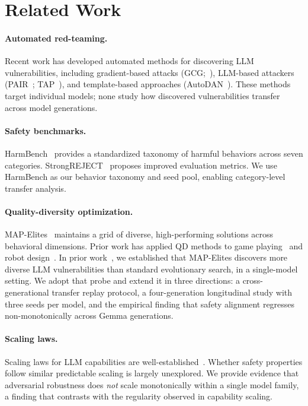 \documentclass{article}
\begin{document}
\section{Related Work}
\label{sec:related}

\paragraph{Automated red-teaming.}
Recent work has developed automated methods for discovering LLM
vulnerabilities, including gradient-based attacks
(GCG;~\cite{zou2023universal}), LLM-based attackers
(PAIR~\cite{chao2023jailbreaking}; TAP~\cite{mehrotra2024tree}),
and template-based approaches (AutoDAN~\cite{liu2024autodan}).
These methods target individual models; none study how discovered
vulnerabilities transfer across model generations.

\paragraph{Safety benchmarks.}
HarmBench~\cite{mazeika2024harmbench} provides a standardized taxonomy
of harmful behaviors across seven categories.
StrongREJECT~\cite{souly2024strongreject} proposes improved evaluation
metrics. We use HarmBench as our behavior taxonomy and seed pool,
enabling category-level transfer analysis.

\paragraph{Quality-diversity optimization.}
MAP-Elites~\cite{mouret2015illuminating} maintains a grid of diverse,
high-performing solutions across behavioral dimensions. Prior work has
applied QD methods to game playing~\cite{fontaine2020covariance} and
robot design~\cite{cully2015robots}.
In prior work~\citep{mitra2026qd}, we established that MAP-Elites
discovers more diverse LLM vulnerabilities than standard evolutionary
search, in a single-model setting. We adopt that probe and extend it in
three directions: a cross-generational transfer replay protocol,
a four-generation longitudinal study with three seeds per model,
and the empirical finding that safety alignment regresses
non-monotonically across Gemma generations.

\paragraph{Scaling laws.}
Scaling laws for LLM capabilities are well-established~\cite{kaplan2020scaling,
hoffmann2022training}. Whether safety properties follow similar predictable
scaling is largely unexplored. We provide evidence that adversarial
robustness does \emph{not} scale monotonically within a single model
family, a finding that contrasts with the regularity observed in
capability scaling.
\end{document}
